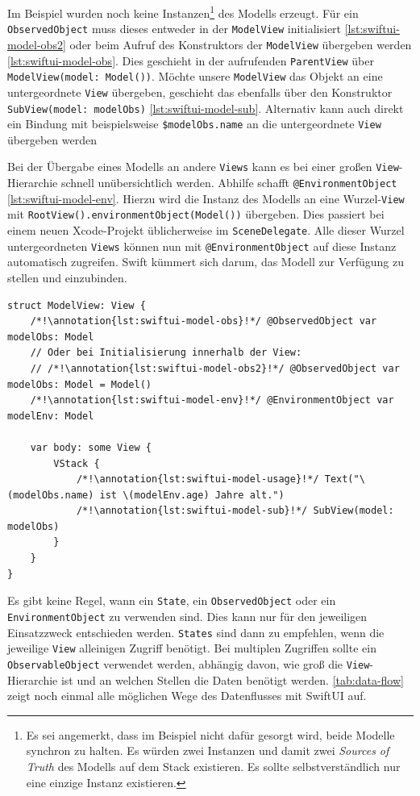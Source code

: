 Im Beispiel wurden noch keine Instanzen\footnote{Es sei angemerkt, dass im Beispiel nicht dafür gesorgt wird, beide Modelle synchron zu halten. Es würden zwei Instanzen und damit zwei \emph{Sources of Truth} des Modells auf dem Stack existieren. Es sollte selbstverständlich nur eine einzige Instanz existieren.} des Modells erzeugt. Für ein \texttt{ObservedObject} muss dieses entweder in der \texttt{ModelView} initialisiert \ref*{lst:swiftui-model-obs2} oder beim Aufruf des Konstruktors der \texttt{ModelView} übergeben werden \ref*{lst:swiftui-model-obs}. Dies geschieht in der aufrufenden \texttt{ParentView} über \texttt{ModelView(model: Model())}. Möchte unsere \texttt{ModelView} das Objekt an eine untergeordnete \texttt{View} übergeben, geschieht das ebenfalls über den Konstruktor \texttt{SubView(model: modelObs)} \ref*{lst:swiftui-model-sub}. Alternativ kann auch direkt ein Bindung mit beispielsweise \texttt{\$modelObs.name} an die untergeordnete \texttt{View} übergeben werden

 Bei der Übergabe eines Modells an andere \texttt{Views} kann es bei einer großen \texttt{View}-Hierarchie schnell unübersichtlich werden. Abhilfe schafft \texttt{@EnvironmentObject} \ref*{lst:swiftui-model-env}. Hierzu wird die Instanz des Modells an eine Wurzel-\texttt{View} mit  \texttt{RootView().environmentObject(Model())} übergeben. Dies passiert bei einem neuen Xcode-Projekt üblicherweise im \texttt{SceneDelegate}. Alle dieser Wurzel untergeordneten \texttt{Views} können nun mit \texttt{@EnvironmentObject} auf diese Instanz automatisch zugreifen. Swift kümmert sich darum, das Modell zur Verfügung zu stellen und einzubinden.

\begin{lstlisting}[caption={ModelView.swift},label={lst:swiftui-model-view}]
struct ModelView: View {
    /*!\annotation{lst:swiftui-model-obs}!*/ @ObservedObject var modelObs: Model
    // Oder bei Initialisierung innerhalb der View:
    // /*!\annotation{lst:swiftui-model-obs2}!*/ @ObservedObject var modelObs: Model = Model()
    /*!\annotation{lst:swiftui-model-env}!*/ @EnvironmentObject var modelEnv: Model
    
    var body: some View {
        VStack {
            /*!\annotation{lst:swiftui-model-usage}!*/ Text("\(modelObs.name) ist \(modelEnv.age) Jahre alt.")
            /*!\annotation{lst:swiftui-model-sub}!*/ SubView(model: modelObs)
        }
    }
}
\end{lstlisting}\setcounter{lstannotation}{0}

Es gibt keine Regel, wann ein \texttt{State}, ein \texttt{ObservedObject} oder ein \texttt{EnvironmentObject} zu verwenden sind. Dies kann nur für den jeweiligen Einsatzzweck entschieden werden. \texttt{States} sind dann zu empfehlen, wenn die jeweilige \texttt{View} alleinigen Zugriff benötigt. Bei multiplen Zugriffen sollte ein \texttt{ObservableObject} verwendet werden, abhängig davon, wie groß die \texttt{View}-Hierarchie ist und an welchen Stellen die Daten benötigt werden. \autoref{tab:data-flow} zeigt noch einmal alle möglichen Wege des Datenflusses mit SwiftUI auf.

